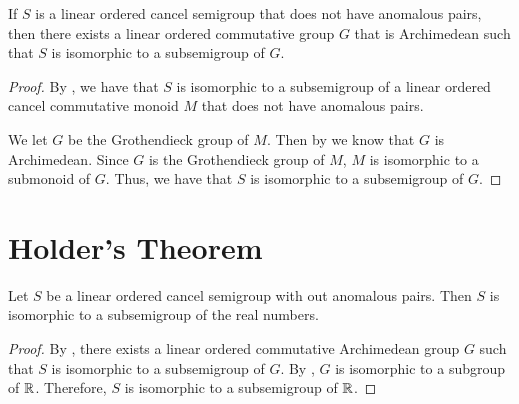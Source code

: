 \begin{theorem}\label{to_arch_group}
    \leanok
    If $S$ is a linear ordered cancel semigroup
    that does not have anomalous pairs, then
    there exists a linear ordered commutative group $G$
    that is Archimedean
    such that $S$ is isomorphic to a subsemigroup of $G$.
\end{theorem}
\begin{proof}\leanok
By , we have that
$S$ is isomorphic to a subsemigroup of a
linear ordered cancel commutative monoid $M$ that
does not have anomalous pairs.

We let $G$ be the Grothendieck group of $M$.
Then by  we know that $G$
is Archimedean. Since $G$ is the Grothendieck group of $M$,
$M$ is isomorphic to a submonoid of $G$. Thus,
we have that $S$ is isomorphic to a subsemigroup of $G$.
\end{proof}

\section{Holder's Theorem}

\begin{theorem}\label{holder_not_anom}
    \leanok
    Let $S$ be a linear ordered cancel semigroup
    with out anomalous pairs. Then $S$ is isomorphic
    to a subsemigroup of the real numbers.
\end{theorem}
\begin{proof}\leanok
By , there exists a linear ordered commutative
Archimedean group $G$
such that $S$ is isomorphic to a subsemigroup of $G$.
By , $G$ is isomorphic to a subgroup of $\mathbb{R}$.
Therefore, $S$ is isomorphic to a subsemigroup of $\mathbb{R}$.
\end{proof}